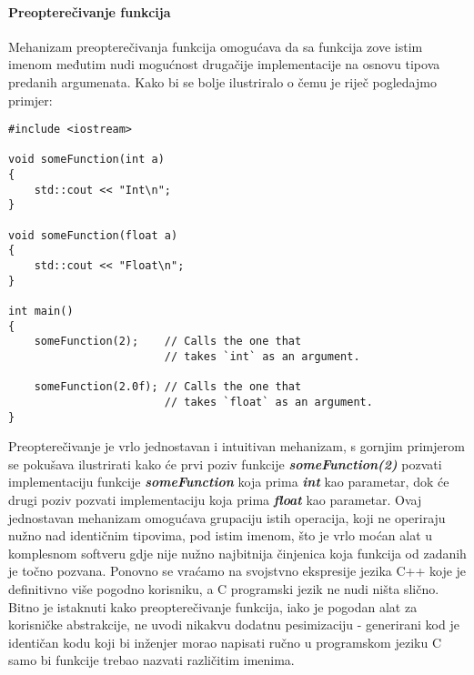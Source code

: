 \paragraph{Preopterečivanje funkcija}\label{subsection:functionOverloading}
Mehanizam preopterečivanja funkcija omogućava da sa funkcija zove istim imenom međutim nudi mogućnost drugačije implementacije na osnovu tipova predanih argumenata. Kako bi se bolje ilustriralo o čemu je riječ pogledajmo primjer:
\lstset{language=C++, tabsize=2, frame=single, breaklines=true}
\begin{lstlisting}
#include <iostream>

void someFunction(int a)
{
    std::cout << "Int\n";
}

void someFunction(float a)
{
    std::cout << "Float\n";
}

int main()
{
    someFunction(2);    // Calls the one that
                        // takes `int` as an argument. 
    
    someFunction(2.0f); // Calls the one that 
                        // takes `float` as an argument. 
}
\end{lstlisting}
Preopterečivanje je vrlo jednostavan i intuitivan mehanizam, s gornjim primjerom se pokušava ilustrirati kako će prvi poziv funkcije \textbf{\textit{someFunction(2)}} pozvati implementaciju funkcije \textbf{\textit{someFunction}} koja prima \textbf{\textit{int}} kao parametar, dok će drugi poziv pozvati implementaciju koja prima \textbf{\textit{float}} kao parametar. Ovaj jednostavan mehanizam omogućava grupaciju istih operacija, koji ne operiraju nužno nad identičnim tipovima, pod istim imenom, što je vrlo moćan alat u komplesnom softveru gdje nije nužno najbitnija činjenica koja funkcija od zadanih je točno pozvana. Ponovno se vraćamo na svojstvno ekspresije jezika C++ koje je definitivno više pogodno korisniku, a C programski jezik ne nudi ništa slično. Bitno je istaknuti kako preopterečivanje funkcija, iako je pogodan alat za korisničke abstrakcije, ne uvodi nikakvu dodatnu pesimizaciju - generirani kod je identičan kodu koji bi inženjer morao napisati ručno u programskom jeziku C samo bi funkcije trebao nazvati različitim imenima. 

